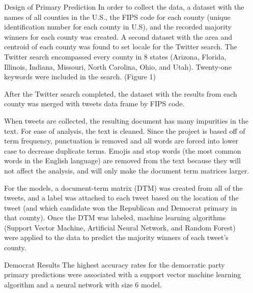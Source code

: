 \documentclass[final]{beamer}
\newlength{\onecolwid}
\newlength{\twocolwid}
\begin{document}
\begin{frame}[t]
\begin{columns}[t]
\begin{column}{\twocolwid}
\begin{columns}[t,totalwidth=\twocolwid]
\begin{column}{\onecolwid}
\begin{block}{Design of Primary Prediction}
In order to collect the data, a dataset with the names of all counties in the U.S., the FIPS code for each county (unique identification number for each county in U.S), and the recorded majority winners for each county was created.  A second dataset with the area and centroid of each county was found to set locale for the Twitter search.  The Twitter search encompassed every county in 8 states (Arizona, Florida, Illinois, Indiana, Missouri, North Carolina, Ohio, and Utah).  Twenty-one keywords were included in the search. (Figure 1)

After the Twitter search completed, the dataset with the results from each county was merged with tweets data frame by FIPS code.

When tweets are collected, the resulting document has many impurities in the text.  For ease of analysis, the text is cleaned.  Since the project is based off of term frequency, punctuation is removed and all words are forced into lower case to decrease duplicate terms.  Emojis and stop words (the most common words in the English language) are removed from the text because they will not affect the analysis, and will only make the document term matrices larger. 

For the models, a document-term matrix (DTM) was created from all of the tweets, and a label was attached to each tweet based on the location of the tweet (and which candidate won the Republican and Democrat primary in that county).  Once the DTM was labeled, machine learning algorithms (Support Vector Machine, Artificial Neural Network, and Random Forest) were applied to the data to predict the majority winners of each tweet's county.
\end{block}

\begin{block}{Democrat Results}
	The highest accuracy rates for the democratic party primary predictions were associated with a support vector machine learning algorithm and a neural network with size 6 model.
\end{block}



\end{column} %




\begin{column}{\onecolwid} %


\end{column}
\end{columns}
\end{column}
\end{columns}
\end{frame}
\end{document}
